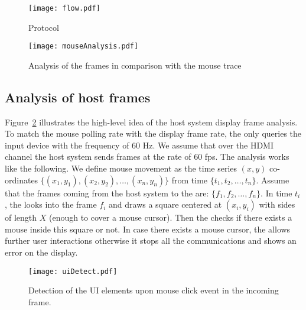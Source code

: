 \begin{figure}
\centering
\texttt{[image: flow.pdf]}
\caption{Protocol}
\label{fig:protocol}
\centering
\end{figure}




\begin{figure}
\centering
\texttt{[image: mouseAnalysis.pdf]}
\caption{Analysis of the frames in comparison with the mouse trace}
\label{fig:mouseAnalysis}
\centering
\end{figure}


\subsection{Analysis of host frames}
\label{sec:idea:analysis}

Figure~\ref{fig:mouseAnalysis} illustrates the high-level idea of the host system display frame analysis. To match the mouse polling rate with the display frame rate, the \device only queries the input device with the frequency of $60$ Hz. We assume that over the HDMI channel the host system sends frames at the rate of $60$ fps. The analysis works like the following. We define mouse movement as the time series $(x,y)$ co-ordinates $\{(x_1,y_1), (x_2, y_2), \ldots, (x_n,y_n)\}$ from time $\{t_1, t_2, \ldots, t_n\}$. Assume that the frames coming from the host system to the \device are: $\{f_1, f_2, \ldots, f_n\}$. In time $t_i$, the \device looks into the frame $f_i$ and draws a square centered at $(x_i, y_i)$ with sides of length $X$ (enough to cover a mouse cursor). Then the \device checks if there exists a mouse inside this square or not. In case there exists a mouse cursor, the \device allows further user interactions otherwise it stops all the communications and shows an error on the display.

\begin{figure}
\centering
\texttt{[image: uiDetect.pdf]}
\caption{Detection of the UI elements upon mouse click event in the incoming frame.}
\label{fig:uiDetect}
\centering
\end{figure}

